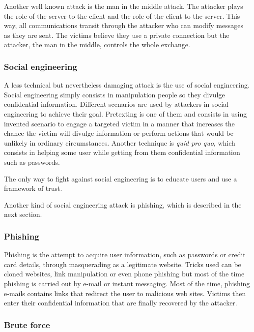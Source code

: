Another well known attack is the man in the middle attack. The
attacker plays the role of the server to the client and the role of the client
to the server. This way, all communications transit through the attacker who can
modify messages as they are sent. The victims believe they use a private
connection but the attacker, the man in the middle, controls the whole exchange.

\subsubsection{Social engineering}

A less technical but nevertheless damaging attack is the use of social
engineering. Social engineering simply consists in manipulation people so they
divulge confidential information. Different scenarios are used by attackers in
social engineering to achieve their goal. Pretexting is one of them and consists
in using invented scenario to engage a targeted victim in a manner that
increases the chance the victim will divulge information or perform actions
that would be unlikely in ordinary circumstances. Another technique is
\textit{quid pro quo}, which consists in helping some user while getting from
them confidential information such as passwords.

The only way to fight against social engineering is to educate users and use a
framework of trust.

Another kind of social engineering attack is phishing, which is described in
the next section.

\subsubsection{Phishing}

Phishing is the attempt to acquire user information, such as passwords or credit
card details, through masquerading as a legitimate website. Tricks used can be
cloned websites, link manipulation or even phone phishing but most of the time
phishing is carried out by e-mail or instant messaging. Most of the time,
phishing e-mails contains links that redirect the user to malicious web sites.
Victims then enter their confidential information that are finally recovered
by the attacker.

\subsubsection{Brute force}

